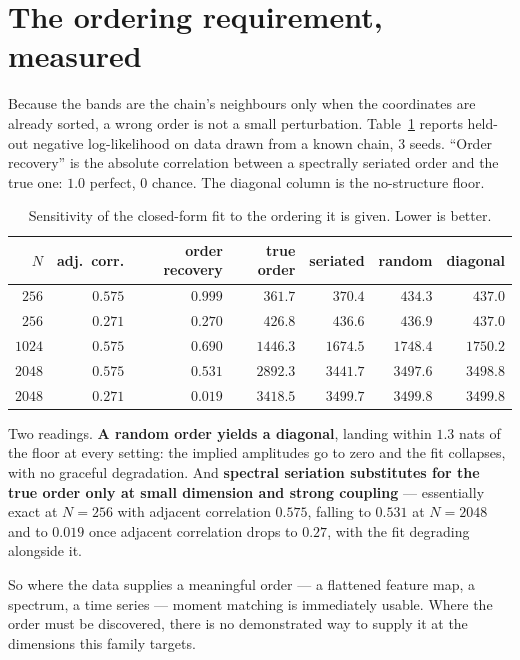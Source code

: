 \documentclass[11pt,a4paper]{article}
\begin{document}
\section{The ordering requirement, measured}
\label{sec:ordering}

Because the bands are the chain's neighbours only when the coordinates are already sorted, a
wrong order is not a small perturbation. Table~\ref{tab:order} reports held-out negative
log-likelihood on data drawn from a known chain, 3 seeds. ``Order recovery'' is the absolute
correlation between a spectrally seriated order and the true one: $1.0$ perfect, $0$ chance.
The diagonal column is the no-structure floor.

\begin{table}[htbp]
\centering
\caption{Sensitivity of the closed-form fit to the ordering it is given. Lower is better.}
\label{tab:order}
\begin{tabular}{@{}rrrrrrr@{}}
\toprule
$N$ & adj.\ corr. & order recovery & true order & seriated & random & diagonal \\
\midrule
$256$  & $0.575$ & $\mathbf{0.999}$ & $361.7$  & $370.4$  & $434.3$  & $437.0$  \\
$256$  & $0.271$ & $0.270$          & $426.8$  & $436.6$  & $436.9$  & $437.0$  \\
$1024$ & $0.575$ & $0.690$          & $1446.3$ & $1674.5$ & $1748.4$ & $1750.2$ \\
$2048$ & $0.575$ & $0.531$          & $2892.3$ & $3441.7$ & $3497.6$ & $3498.8$ \\
$2048$ & $0.271$ & $0.019$          & $3418.5$ & $3499.7$ & $3499.8$ & $3499.8$ \\
\bottomrule
\end{tabular}
\end{table}

Two readings. \textbf{A random order yields a diagonal}, landing within $1.3$ nats of the floor
at every setting: the implied amplitudes go to zero and the fit collapses, with no graceful
degradation. And \textbf{spectral seriation substitutes for the true order only at small
dimension and strong coupling} --- essentially exact at $N = 256$ with adjacent correlation
$0.575$, falling to $0.531$ at $N = 2048$ and to $0.019$ once adjacent correlation drops to
$0.27$, with the fit degrading alongside it.

So where the data supplies a meaningful order --- a flattened feature map, a spectrum, a time
series --- moment matching is immediately usable. Where the order must be discovered, there is
no demonstrated way to supply it at the dimensions this family targets.
\end{document}
